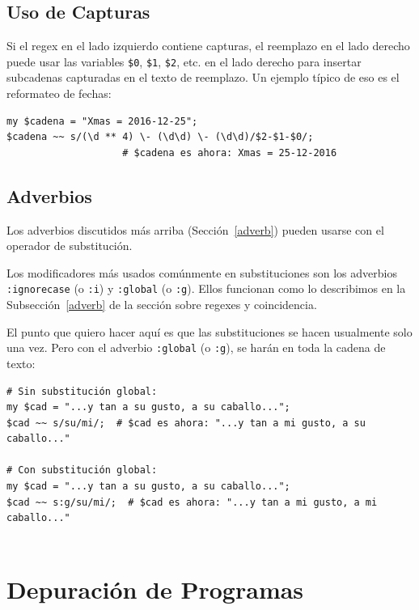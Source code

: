 \subsection{Uso de Capturas}

Si el regex en el lado izquierdo contiene capturas, el 
reemplazo en el lado derecho puede usar las variables
\verb|$0|, \verb|$1|, \verb|$2|, etc. en el lado derecho para 
insertar subcadenas capturadas en el texto de reemplazo. Un 
ejemplo típico de eso es el reformateo de fechas:

\begin{verbatim}
my $cadena = "Xmas = 2016-12-25";
$cadena ~~ s/(\d ** 4) \- (\d\d) \- (\d\d)/$2-$1-$0/;
                    # $cadena es ahora: Xmas = 25-12-2016
\end{verbatim}
%

\subsection{Adverbios}
\label{regex_adverbs}

Los adverbios discutidos más arriba (Sección~\ref{adverb})
pueden usarse con el operador de substitución. 

Los modificadores más usados comúnmente en substituciones
son los adverbios {\tt :ignorecase} (o {\tt :i}) y 
{\tt :global} (o {\tt :g}). Ellos funcionan como lo describimos
en la Subsección~\ref{adverb} de la sección sobre regexes 
y coincidencia.

El punto que quiero hacer aquí es que las substituciones se hacen
usualmente solo una vez. Pero con el adverbio 
{\tt :global} (o {\tt :g}), se harán en toda la cadena de texto:

\begin{verbatim}
# Sin substitución global:
my $cad = "...y tan a su gusto, a su caballo...";
$cad ~~ s/su/mi/;  # $cad es ahora: "...y tan a mi gusto, a su caballo..."

# Con substitución global:
my $cad = "...y tan a su gusto, a su caballo...";
$cad ~~ s:g/su/mi/;  # $cad es ahora: "...y tan a mi gusto, a mi caballo..."
                    
\end{verbatim}
%


\section{Depuración de Programas}

